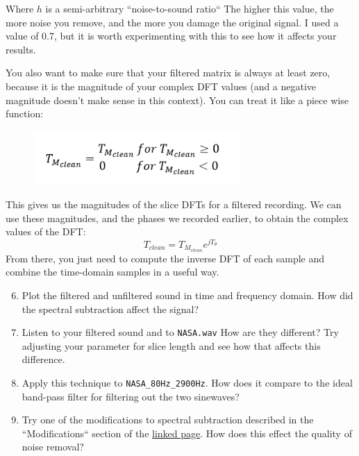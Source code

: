 \documentclass{tufte-handout}
\begin{document}
Where $h$ is a semi-arbitrary ``noise-to-sound ratio`` The higher this value, the more noise you remove, and the more you damage the original signal. I used a value of 0.7, but it is worth experimenting with this to see how it affects your results.

You also want to make sure that your filtered matrix is always at least zero, because it is the magnitude of your complex DFT values (and a negative magnitude doesn't make sense in this context). You can treat it like a piece wise function: \\
\begin{figure}
	\centering 
	\includegraphics[width=0.7\textwidth]{piecewise.png}
	\label{fig:piecewise}
 \end{figure}
This gives us the magnitudes of the slice DFTs for a filtered recording. We can use these magnitudes, and the phases we recorded earlier, to obtain the complex values of the DFT:
\begin{equation}
	T_{clean} = T_{M_{clean}}e^{jT_\theta}
\end{equation}
From there, you just need to compute the inverse DFT of each sample and combine the time-domain samples in a useful way.
\begin{enumerate}
	\setcounter{enumi}{5}
	\item Plot the filtered and unfiltered sound in time and frequency domain. How did the spectral subtraction affect the signal?
	\item Listen to your filtered sound and to \verb|NASA.wav| How are they different? Try adjusting your parameter for slice length and see how that affects this difference.
	\item Apply this technique to \verb|NASA_80Hz_2900Hz|. How does it compare to the ideal band-pass filter for filtering out the two sinewaves?
	\item Try one of the modifications to spectral subtraction described in the ``Modifications`` section of the \href{http://practicalcryptography.com/miscellaneous/machine-learning/tutorial-spectral-subraction/}{linked page}. How does this effect the quality of noise removal?
\end{enumerate}

\end{document}
